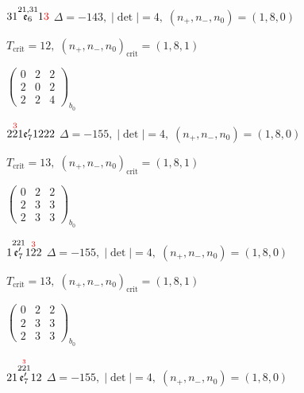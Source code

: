 \documentclass[10pt]{article}
\begin{document}
\smallskip

$31\overset{21,31}{\mathfrak{e}_6}1\textcolor{red}{3}$ \quad $\Delta=-143,\; |\det|=4,\; (n_+,n_-,n_0)=(1,8,0)$

\hspace{1em}$T_{\text{crit}}=12,\; (n_+,n_-,n_0)_{\text{crit}}=(1,8,1)$

\hspace{2em}$\left(\begin{smallmatrix}0 & 2 & 2 \\ 2 & 0 & 2 \\ 2 & 2 & 4\end{smallmatrix}\right)_{\!b_0}$

\smallskip

$2\overset{\textcolor{red}{3}}{2}1\mathfrak{e}_7'1222$ \quad $\Delta=-155,\; |\det|=4,\; (n_+,n_-,n_0)=(1,8,0)$

\hspace{1em}$T_{\text{crit}}=13,\; (n_+,n_-,n_0)_{\text{crit}}=(1,8,1)$

\hspace{2em}$\left(\begin{smallmatrix}0 & 2 & 2 \\ 2 & 3 & 3 \\ 2 & 3 & 3\end{smallmatrix}\right)_{\!b_0}$

\smallskip

$1\overset{221}{\mathfrak{e}_7'}1\overset{\textcolor{red}{3}}{2}2$ \quad $\Delta=-155,\; |\det|=4,\; (n_+,n_-,n_0)=(1,8,0)$

\hspace{1em}$T_{\text{crit}}=13,\; (n_+,n_-,n_0)_{\text{crit}}=(1,8,1)$

\hspace{2em}$\left(\begin{smallmatrix}0 & 2 & 2 \\ 2 & 3 & 3 \\ 2 & 3 & 3\end{smallmatrix}\right)_{\!b_0}$

\smallskip

$21\overset{2\overset{\textcolor{red}{3}}{2}1}{\mathfrak{e}_7'}12$ \quad $\Delta=-155,\; |\det|=4,\; (n_+,n_-,n_0)=(1,8,0)$
\end{document}
